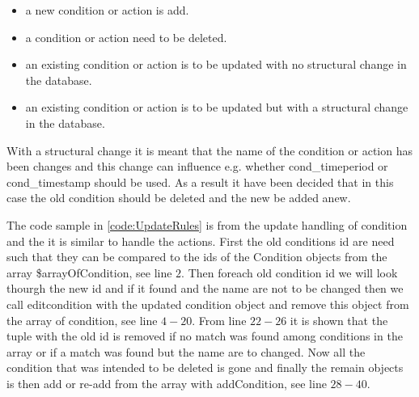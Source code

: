 \begin{itemize}
	\item a new condition or action is add.
	\item a condition or action need to be deleted.
	\item an existing condition or action is to be updated with no structural change in the database.
	\item an existing condition or action is to be updated but with a structural change in the database.
\end{itemize}

With a structural change it is meant that the name of the condition or action has been changes and this change can influence e.g. whether cond\_timeperiod or cond\_timestamp should be used. As a result it have been decided that in this case the old condition should be deleted and the new be added anew. 

The code sample in \ref{code:UpdateRules} is from the update handling of condition and the it is similar to handle the actions. First the old conditions id are need such that they can be compared to the ids of the Condition objects from the array \$arrayOfCondition, see line $2$. 
Then foreach old condition id we will look thourgh the new id and if it found and the name are not to be changed then we call editcondition with the updated condition object and remove this object from the array of condition, see line $4-20$. 
From line $22-26$ it is shown that the tuple with the old id is removed if no match was found among conditions in the array or if a match was found but the name are to changed. Now all the condition that was intended to be deleted is gone and finally the remain objects is then add or re-add from the array with addCondition, see line $28-40$.


